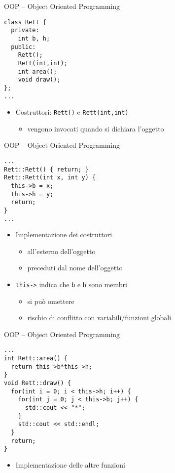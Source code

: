 \begin{frame}[fragile]{OOP -- Object Oriented Programming}
  \vfill
  \begin{lstlisting}[firstnumber=2]
class Rett {
  private:
    int b, h;
  public:
    Rett();
    Rett(int,int);
    int area();
    void draw();
};
...
  \end{lstlisting}
  \vfill
  \begin{itemize}
    \item \alert{Costruttori}: \lstinline$Rett()$ e \lstinline$Rett(int,int)$
    \begin{itemize}
      \item vengono invocati quando si dichiara l'oggetto
    \end{itemize}
  \end{itemize}
  \vfill
\end{frame}

\begin{frame}[fragile]{OOP -- Object Oriented Programming}
  \vfill
  \begin{lstlisting}[firstnumber=16]
...
Rett::Rett() { return; }
Rett::Rett(int x, int y) {
  this->b = x;
  this->h = y;
  return;
}
...\end{lstlisting}
  \vfill
  \begin{itemize}
    \item Implementazione dei costruttori
    \begin{itemize}
      \item all'esterno dell'oggetto
      \item preceduti dal nome dell'oggetto
    \end{itemize}
    \vfill
    \item \lstinline$this->$ indica che \lstinline$b$ e \lstinline$h$ sono membri
    \begin{itemize}
      \item si può omettere
      \item rischio di conflitto con variabili/funzioni globali
    \end{itemize}
  \end{itemize}
  \vfill
\end{frame}

\begin{frame}[fragile]{OOP -- Object Oriented Programming}
  \vfill
  \begin{lstlisting}[firstnumber=22]
...
int Rett::area() {
  return this->b*this->h;
}
void Rett::draw() {
  for(int i = 0; i < this->h; i++) {
    for(int j = 0; j < this->b; j++) {
      std::cout << "*";
    }
    std::cout << std::endl;
  }
  return;
}
  \end{lstlisting}
  \vfill
  \begin{itemize}
    \item Implementazione delle altre funzioni
  \end{itemize}
  \vfill
\end{frame}

